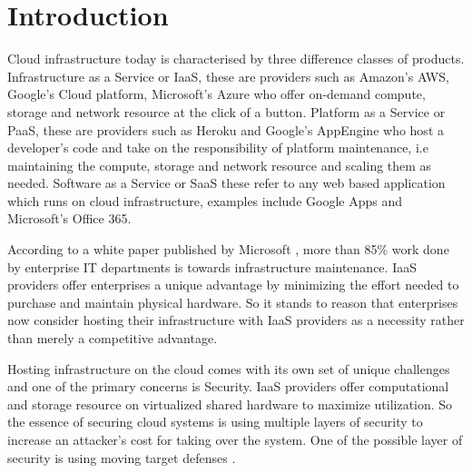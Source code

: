 \documentclass{sig-alternate-05-2015}
\begin{document}
\printccsdesc


\section{Introduction}

Cloud infrastructure today is characterised by three difference classes of products. Infrastructure as a Service or IaaS, these are providers such as Amazon's AWS, Google's Cloud platform, Microsoft's Azure who offer on-demand compute, storage and network resource at the click of a button.  Platform as a Service or PaaS, these are providers such as Heroku and Google's AppEngine who host a developer's code and take on the responsibility of platform maintenance, i.e maintaining the compute, storage and network resource and scaling them as needed. Software as a Service or SaaS these refer to any web based application which runs on cloud infrastructure, examples include Google Apps and Microsoft's Office 365.

According to a white paper published by Microsoft \cite{harms_economics_2010}, more than 85\% work done by enterprise IT departments is towards infrastructure maintenance. IaaS providers offer enterprises a unique advantage by minimizing the effort needed to purchase and maintain physical hardware. So it stands to reason that enterprises now consider hosting their infrastructure with IaaS providers as a necessity rather than merely a competitive advantage\cite{mcafee_what_2011}.

Hosting infrastructure on the cloud comes with its own set of unique challenges and one of the primary concerns is Security. IaaS providers offer computational and storage resource on virtualized shared hardware to maximize utilization. So the essence of securing cloud systems is using multiple layers \cite{panwar_layered_2011} of security to increase an attacker's cost for taking over the system. One of the possible layer of security is using moving target defenses \cite{evans_effectiveness_2011}. 
\end{document}
